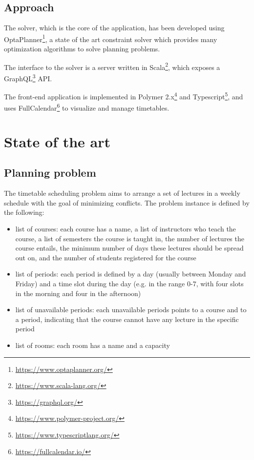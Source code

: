 \documentclass[12pt, a4paper, english]{report}
\def\bullet{\(\triangleright\)}
\begin{document}
\section{Approach}
The solver, which is the core of the application, has been developed using OptaPlanner\footnote{\url{https://www.optaplanner.org/}}, a state of the art constraint solver which provides many optimization algorithms to solve planning problems.\par
The interface to the solver is a server written in Scala\footnote{\url{https://www.scala-lang.org/}}, which exposes a GraphQL\footnote{\url{https://graphql.org/}} API.\par
The front-end application is implemented in {Polymer 2.x}\footnote{\url{https://www.polymer-project.org/}} and Typescript\footnote{\url{https://www.typescriptlang.org/}}, and uses FullCalendar\footnote{\url{https://fullcalendar.io/}} to visualize and manage timetables.


\chapter{State of the art}

\section{Planning problem}
The timetable scheduling problem aims to arrange a set of lectures in a weekly schedule with the goal of minimizing conflicts. The problem instance is defined by the following:
\begin{itemize}[label=\bullet]
\item list of courses: each course has a name, a list of instructors who teach the course, a list of semesters the course is taught in, the number of lectures the course entails, %
the minimum number of days these lectures should be spread out on, and the number of students registered for the course
\item list of periods: each period is defined by a day (usually between Monday and Friday) and a time slot during the day (e.g. in the range 0-7, with four slots in the morning and four in the afternoon)
\item list of unavailable periods: each unavailable periods points to a course and to a period, indicating that the course cannot have any lecture in the specific period
\item list of rooms: each room has a name and a capacity
\end{itemize}
\end{document}
